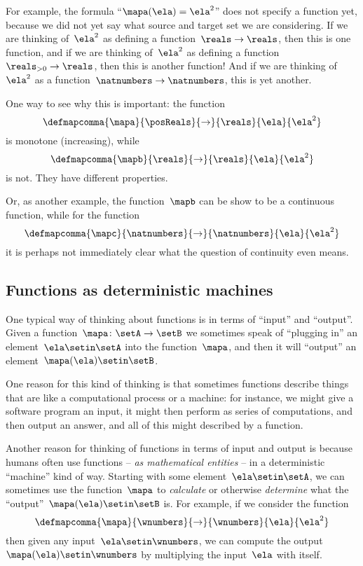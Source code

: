 For example, the formula ``$\mapa(\ela)=\ela^2$'' does not specify a function yet, because we did not yet say what source and target set we are considering.
If we are thinking of~$\ela^2$ as defining a function~$\reals \to \reals$, then this is one function, and if we are thinking of~$\ela^2$ as defining a function~$\reals_{> 0} \to \reals$, then this is another function!
And if we are thinking of~$\ela^2$ as a function~$\natnumbers \to \natnumbers$, this is yet another.

One way to see why this is important: the function
\begin{equation*}
    \defmapcomma{\mapa}{\posReals}{\to}{\reals}{\ela}{\ela^2}
\end{equation*}
is monotone (increasing), while
\begin{equation*}
    \defmapcomma{\mapb}{\reals}{\to}{\reals}{\ela}{\ela^2}
\end{equation*}
is not.
They have different properties.

Or, as another example, the function~$\mapb$ can be show to be a continuous function,
while for the function
\begin{equation*}
    \defmapcomma{\mapc}{\natnumbers}{\to}{\natnumbers}{\ela}{\ela^2}
\end{equation*}
it is perhaps not immediately clear what the question of continuity even means.

\subsection{Functions as deterministic machines}

One typical way of thinking about functions is in terms of ``input'' and ``output''.
Given a function~$\mapa\colon \setA \to \setB$ we sometimes speak of ``plugging in'' an element~$\ela \setin\setA$ into the function~$\mapa$, and then it will ``output'' an element~$\mapa(\ela) \setin\setB$.

One reason for this kind of thinking is that sometimes functions describe things that are like a computational process or a machine:
for instance, we might give a software program an input, it might then perform as series of computations, and then output an answer, and all of this might described by a function.

Another reason for thinking of functions in terms of input and output is because humans often use functions -- \emph{as mathematical entities} -- in a deterministic ``machine'' kind of way.
Starting with some element~$\ela \setin\setA$, we can sometimes use the function~$\mapa$ to \emph{calculate} or otherwise \emph{determine} what the ``output''~$\mapa(\ela) \setin\setB$ is.
For example, if we consider the function
\begin{equation}
    \label{eq:square-function-whole-numbers}
    \defmapcomma{\mapa}{\wnumbers}{\to}{\wnumbers}{\ela}{\ela^2}
\end{equation}
then given any input~$\ela \setin\wnumbers$, we can compute the output~$\mapa(\ela) \setin\wnumbers$ by multiplying the input~$\ela$ with itself.

